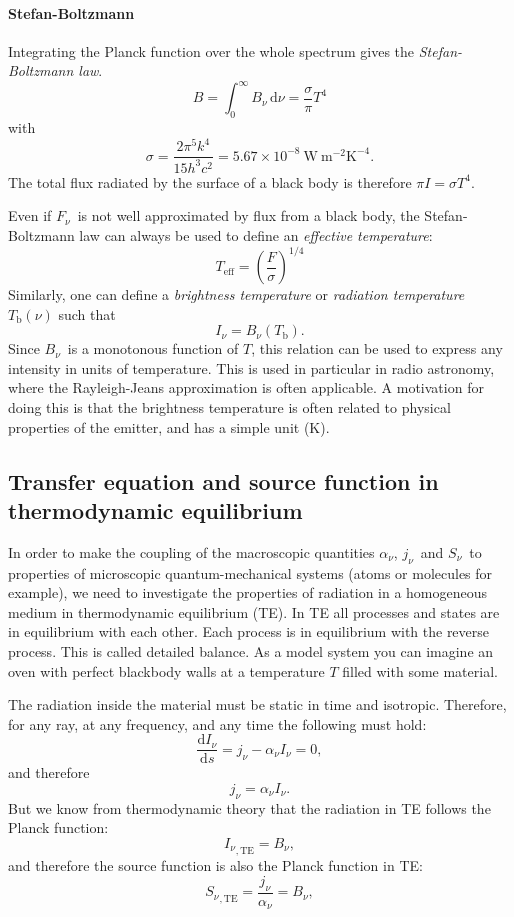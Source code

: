 \documentclass[12pt]{article}
\numberwithin{equation}{section}
\def\dd{\mathrm{d}}
\def\Inu{\ensuremath{I_{\nu}}}
\def\jnu{\ensuremath{j_{\nu}}}
\def\Bnu{\ensuremath{B_{\nu}}}
\def\Fnu{\ensuremath{F_{\nu}}}
\def\Snu{\ensuremath{S_{\nu}}}
\def\anu{\ensuremath{\alpha_{\nu}}}
\def\Tb{\ensuremath{T_\mathrm{b}}}
\newcommand{\be}{\begin{equation}}
\newcommand{\ee}{\end{equation}}
\begin{document}
\paragraph{Stefan-Boltzmann}
Integrating the Planck function over the whole spectrum gives the {\it Stefan-Boltzmann law}.
\be
B=\int_0^\infty \Bnu \, \dd \nu = \frac{\sigma}{\pi} T^4
\ee
with
\be
\sigma= \frac{2 \pi^5 k^4}{15 h^3 c^2} = 5.67 \times 10^{-8} \ \mathrm{W}\ \mathrm{m}^{-2} \mathrm{K}^{-4}.
\ee
The total flux radiated by the surface of a black body is therefore $\pi I = \sigma T^4$.

Even if \Fnu\ is not well approximated by flux from a black body, the Stefan-Boltzmann law can always be used to define an {\it effective temperature}:
\be
T_\mathrm{eff} = \left( \frac{F}{\sigma} \right)^{1/4}
\ee
Similarly, one can define a {\it brightness temperature} or {\it radiation temperature} $\Tb(\nu)$ such that 
\be
\Inu = \Bnu(\Tb).
\ee
Since \Bnu\ is a monotonous function of $T$, this relation can be used to express any intensity in units of temperature. This is used in particular in radio astronomy, where the Rayleigh-Jeans approximation is often applicable. A motivation for doing this is that the brightness temperature is often related to physical properties of the emitter, and has a simple unit (K).

\subsection{Transfer equation and source function in thermodynamic equilibrium}

In order to make the coupling of the macroscopic quantities \anu, \jnu\ and \Snu\ to properties of microscopic quantum-mechanical systems (atoms or molecules for example), we need to investigate the properties of radiation in a homogeneous medium in thermodynamic equilibrium (TE). In TE all processes and states are in equilibrium with each other. Each process is in equilibrium with the reverse process. This is called detailed balance. As a model system you can imagine an oven with perfect blackbody walls at a temperature $T$ filled with some material.

The radiation inside the material must be static in time and isotropic. Therefore, for any ray, at any frequency, and any time the following must hold:
\be
\frac{\dd \Inu}{\dd s} = \jnu -\anu \Inu = 0,
\ee
and therefore
\be
 \jnu = \anu \Inu.
\ee 
But we know from  thermodynamic theory that the radiation in TE follows the Planck function:
\be
{\Inu}_\mathrm{,TE} =\Bnu,
\ee
and therefore the source function is also the Planck function in TE:
\be
{\Snu}_\mathrm{,TE} =\frac{\jnu}{\anu}=\Bnu,
\ee
\end{document}
